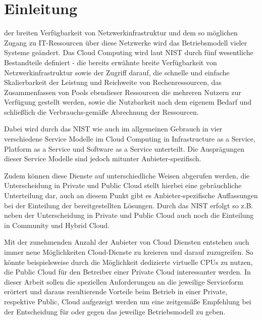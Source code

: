 \documentclass[journal]{IEEEtran}
\begin{document}
\section{Einleitung}
% 
% 
% 
% 
 der breiten Verfügbarkeit von Netzwerkinfrastruktur und dem so möglichen Zugang zu IT-Ressourcen über diese Netzwerke wird das Betriebsmodell vieler Systeme geändert. Das Cloud Computing wird laut NIST durch fünf wesentliche Bestandteile definiert - die bereits erwähnte breite Verfügbarkeit von Netzwerkinfrastruktur sowie der Zugriff darauf, die schnelle und einfache Skalierbarkeit der Leistung und Reichweite von Rechenressourcen, das Zusammenfassen von Pools ebendieser Ressourcen die mehreren Nutzern zur Verfügung gestellt werden, sowie die Nutzbarkeit nach dem eigenem Bedarf und schließlich die Verbrauchs-gemäße Abrechnung der Ressourcen.

Dabei wird durch das NIST wie auch im allgemeinen Gebrauch in vier verschiedene Service Modelle im Cloud Computing in Infrastructure as a Service, Platform as a Service und Software as a Service unterteilt. Die Ausprägungen dieser Service Modelle sind jedoch mitunter Anbieter-spezifisch.

Zudem können diese Dienste auf unterschiedliche Weisen abgerufen werden, die Unterscheidung in Private und Public Cloud stellt hierbei eine gebräuchliche Unterteilung dar, auch an diesem Punkt gibt es Anbieter-spezifische Auffassungen bei der Einteilung der bereitgestellten Lösungen. Durch das NIST erfolgt so z.B. neben der Unterscheidung in Private und Public Cloud auch noch die Einteilung in Community und Hybrid Cloud.

Mit der zunehmenden Anzahl der Anbieter von Cloud Diensten entstehen auch immer neue Möglichkeiten Cloud-Dienste zu kreieren und darauf zuzugreifen. So könnte beispielsweise durch die Möglichkeit dedizierte virtuelle CPUs zu nutzen, die Public Cloud für den Betreiber einer Private Cloud interessanter werden. In dieser Arbeit sollen die speziellen Anforderungen an die jeweilige Serviceform erörtert und daraus resultierende Vorteile beim Betrieb in einer Private, respektive Public, Cloud aufgezeigt werden um eine zeitgemäße Empfehlung bei der Entscheidung für oder gegen das jeweilige Betriebsmodell zu geben. 
\end{document}
